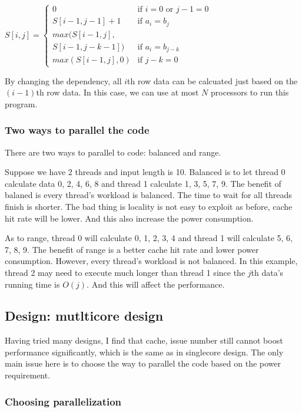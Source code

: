\documentclass[twocolumn,letterpaper,10pt]{article}
\begin{document}
$ S[i,j] =
\begin{cases}
  0 & \text{if }i=0\text{ or }j-1=0 \\
  S[i-1,j-1]+1 & \text{if }a_i=b_j \\
  max(S[i-1,j],\\ S[i-1,j-k-1]) & \text{if }a_i=b_{j-k} \\
  max(S[i-1,j],0) & \text{if }j-k=0
\end{cases} $

By changing the dependency, all $i$th row data can be calcuated just
based on the $(i-1)$th row data. In this case, we can use at most $N$
processors to run this program.

\subsubsection{Two ways to parallel the code}

There are two ways to parallel to code: balanced and range.

Suppose we have 2 threads and input length is 10. Balanced is to let
thread 0 calculate data 0, 2, 4, 6, 8 and thread 1 calculate 1, 3, 5,
7, 9. The benefit of balaned is every thread's workload is
balanced. The time to wait for all threads finish is shorter. The bad
thing is locality is not easy to exploit as before, cache hit rate
will be lower. And this also increase the power consumption.

As to range, thread 0 will calculate 0, 1, 2, 3, 4 and thread 1 will
calculate 5, 6, 7, 8, 9. The benefit of range is a better cache hit
rate and lower power consumption. However, every thread's workload is
not balanced. In this example, thread 2 may need to execute much
longer than thread 1 since the $j$th data's running time is
$O(j)$. And this will affect the performance.

\subsection{Design: mutlticore design}

Having tried many designs, I find that cache, issue number still
cannot boost performance significantly, which is the same as in
singlecore design. The only main issue here is to choose the way to
parallel the code based on the power requirement.

\subsubsection{Choosing parallelization}
\end{document}
